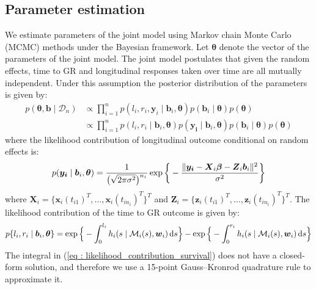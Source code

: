 \subsection{Parameter estimation}
\label{subsec : jm_param_estimation_bayesian}
We estimate parameters of the joint model using Markov chain Monte Carlo (MCMC) methods under the Bayesian framework. Let $\boldsymbol{\theta}$ denote the vector of the parameters of the joint model. The joint model postulates that given the random effects, time to GR and longitudinal responses taken over time are all mutually independent. Under this assumption the posterior distribution of the parameters is given by:
\begin{align*}
p(\boldsymbol{\theta}, \boldsymbol{b} \mid \mathcal{D}_n) & \propto \prod_{i=1}^n p(l_i, r_i, \boldsymbol{y}_i \mid \boldsymbol{b}_i, \boldsymbol{\theta}) p(\boldsymbol{b}_i \mid \boldsymbol{\theta}) p(\boldsymbol{\theta})\\
& \propto \prod_{i=1}^n p(l_i, r_i \mid \boldsymbol{b}_i, \boldsymbol{\theta}) p(\boldsymbol{y_i} \mid \boldsymbol{b}_i, \boldsymbol{\theta}) p(\boldsymbol{b}_i \mid \boldsymbol{\theta}) p(\boldsymbol{\theta})
\end{align*}
where the likelihood contribution of longitudinal outcome conditional on random effects is:
\begin{equation*}
p(\boldsymbol{y_i} \mid \boldsymbol{b}_i, \boldsymbol{\theta}) = \frac{1}{\big(\sqrt{2 \pi \sigma^2}\big)^{n_i}} \exp\bigg\{-\frac{\lVert\boldsymbol{y_i} - \boldsymbol{X}_i\boldsymbol{\beta} - \boldsymbol{Z}_i\boldsymbol{b}_i\rVert^2}{\sigma^2}\bigg\}
\end{equation*}
where $\boldsymbol{X}_i = \{\boldsymbol{x}_i(t_{i1})^T, \ldots, \boldsymbol{x}_i(t_{in_i})^T\}^T$ and $\boldsymbol{Z}_i = \{\boldsymbol{z}_i(t_{i1})^T, \ldots, \boldsymbol{z}_i(t_{in_i})^T\}^T$. The likelihood contribution of the time to GR outcome is given by:
\begin{equation}
\label{eq : likelihood_contribution_survival}
p\{l_i,r_i\mid \boldsymbol{b}_i,\boldsymbol{\theta}\} = \exp\Big\{-\int_0^{l_i} h_i(s \mid \mathcal{M}_i(s), \boldsymbol{w}_i)\mathop{}\!\mathrm{d} s\Big\} - \exp\Big\{-\int_0^{r_i}h_i(s \mid \mathcal{M}_i(s), \boldsymbol{w}_i)\mathop{}\!\mathrm{d} s\Big\}
\end{equation}
The integral in (\ref{eq : likelihood_contribution_survival}) does not have a closed-form solution, and therefore we use a 15-point Gauss–Kronrod quadrature rule to approximate it.\\

